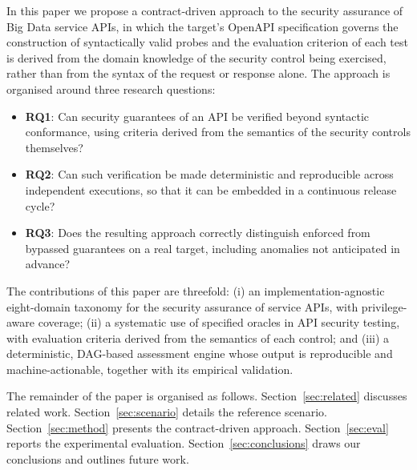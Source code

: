 In this paper we propose a contract-driven approach to the security assurance of Big Data service APIs, in which the target's OpenAPI specification governs the construction of syntactically valid probes and the evaluation criterion of each test is derived from the domain knowledge of the security control being exercised, rather than from the syntax of the request or response alone. The approach is organised around three research questions:

\begin{itemize}
  \item \textbf{RQ1}: Can security guarantees of an API be verified beyond syntactic conformance, using criteria derived from the semantics of the security controls themselves?
  \item \textbf{RQ2}: Can such verification be made deterministic and reproducible across independent executions, so that it can be embedded in a continuous release cycle?
  \item \textbf{RQ3}: Does the resulting approach correctly distinguish enforced from bypassed guarantees on a real target, including anomalies not anticipated in advance?
\end{itemize}

The contributions of this paper are threefold: (i) an implementation-agnostic eight-domain taxonomy for the security assurance of service APIs, with privilege-aware coverage; (ii) a systematic use of specified oracles in API security testing, with evaluation criteria derived from the semantics of each control; and (iii) a deterministic, DAG-based assessment engine whose output is reproducible and machine-actionable, together with its empirical validation.

The remainder of the paper is organised as follows. Section~\ref{sec:related} discusses related work. Section~\ref{sec:scenario} details the reference scenario. Section~\ref{sec:method} presents the contract-driven approach. Section~\ref{sec:eval} reports the experimental evaluation. Section~\ref{sec:conclusions} draws our conclusions and outlines future work.



